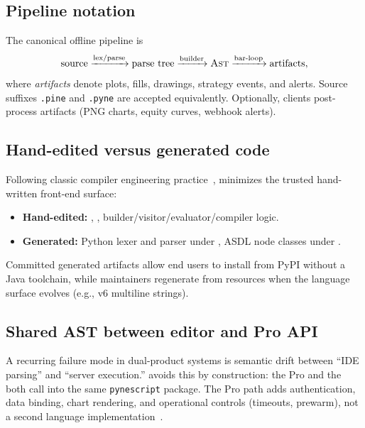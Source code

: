 \documentclass[11pt,a4paper]{article}
\begin{document}
\subsection{Pipeline notation}
\label{sec:pipeline}

The canonical offline pipeline is
\begin{equation}
  \text{source}
  \xrightarrow{\text{lex/parse}}
  \text{parse tree}
  \xrightarrow{\text{builder}}
  \text{\ast{}}
  \xrightarrow{\text{bar-loop}}
  \text{artifacts},
  \label{eq:pipeline}
\end{equation}
where \emph{artifacts} denote plots, fills, drawings, strategy events, and
alerts.
Source suffixes \texttt{.pine} and \texttt{.pyne} are accepted equivalently.
Optionally, clients post-process artifacts (PNG charts, equity curves, webhook
alerts).

\subsection{Hand-edited versus generated code}
\label{sec:hand-gen}

Following classic compiler engineering practice~\citep{aho2006dragon,appeli1997modern},
\pyne{} minimizes the trusted hand-written front-end surface:

\begin{itemize}[leftmargin=1.2em]
  \item \textbf{Hand-edited:}
    ,
    ,
    builder/visitor/evaluator/compiler logic.
  \item \textbf{Generated:}
    Python lexer and parser under ,
    ASDL node classes under .
\end{itemize}

Committed generated artifacts allow end users to install from PyPI without a
Java toolchain, while maintainers regenerate from resources when the language
surface evolves (e.g., v6 multiline strings).

\subsection{Shared AST between editor and Pro API}
\label{sec:shared-ast}

A recurring failure mode in dual-product systems is semantic drift between
``IDE parsing'' and ``server execution.''
\pyne{} avoids this by construction: the Pro \api{} and the \lsp{} both call
into the same \texttt{pynescript} package.
The Pro path adds authentication, data binding, chart rendering, and
operational controls (timeouts, prewarm), not a second language
implementation~\citep{flask}.
\end{document}

